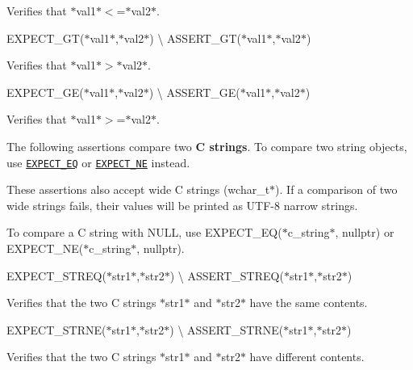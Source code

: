Verifies that $\ast${\ttfamily val1}$\ast${\ttfamily $<$=}$\ast${\ttfamily val2}$\ast$.

{\ttfamily E\+X\+P\+E\+C\+T\+\_\+\+GT(}$\ast${\ttfamily val1}$\ast${\ttfamily ,}$\ast${\ttfamily val2}$\ast${\ttfamily )} \textbackslash{} {\ttfamily A\+S\+S\+E\+R\+T\+\_\+\+GT(}$\ast${\ttfamily val1}$\ast${\ttfamily ,}$\ast${\ttfamily val2}$\ast${\ttfamily )}

Verifies that $\ast${\ttfamily val1}$\ast${\ttfamily $>$}$\ast${\ttfamily val2}$\ast$.

{\ttfamily E\+X\+P\+E\+C\+T\+\_\+\+GE(}$\ast${\ttfamily val1}$\ast${\ttfamily ,}$\ast${\ttfamily val2}$\ast${\ttfamily )} \textbackslash{} {\ttfamily A\+S\+S\+E\+R\+T\+\_\+\+GE(}$\ast${\ttfamily val1}$\ast${\ttfamily ,}$\ast${\ttfamily val2}$\ast${\ttfamily )}

Verifies that $\ast${\ttfamily val1}$\ast${\ttfamily $>$=}$\ast${\ttfamily val2}$\ast$.

The following assertions compare two {\bfseries C strings}. To compare two {\ttfamily string} objects, use \href{#EXPECT_EQ}{\tt {\ttfamily E\+X\+P\+E\+C\+T\+\_\+\+EQ}} or \href{#EXPECT_NE}{\tt {\ttfamily E\+X\+P\+E\+C\+T\+\_\+\+NE}} instead.

These assertions also accept wide C strings ({\ttfamily wchar\+\_\+t$\ast$}). If a comparison of two wide strings fails, their values will be printed as U\+T\+F-\/8 narrow strings.

To compare a C string with {\ttfamily N\+U\+LL}, use {\ttfamily E\+X\+P\+E\+C\+T\+\_\+\+EQ(}$\ast${\ttfamily c\+\_\+string}$\ast${\ttfamily , nullptr)} or {\ttfamily E\+X\+P\+E\+C\+T\+\_\+\+NE(}$\ast${\ttfamily c\+\_\+string}$\ast${\ttfamily , nullptr)}.

{\ttfamily E\+X\+P\+E\+C\+T\+\_\+\+S\+T\+R\+EQ(}$\ast${\ttfamily str1}$\ast${\ttfamily ,}$\ast${\ttfamily str2}$\ast${\ttfamily )} \textbackslash{} {\ttfamily A\+S\+S\+E\+R\+T\+\_\+\+S\+T\+R\+EQ(}$\ast${\ttfamily str1}$\ast${\ttfamily ,}$\ast${\ttfamily str2}$\ast${\ttfamily )}

Verifies that the two C strings $\ast${\ttfamily str1}$\ast$ and $\ast${\ttfamily str2}$\ast$ have the same contents.

{\ttfamily E\+X\+P\+E\+C\+T\+\_\+\+S\+T\+R\+NE(}$\ast${\ttfamily str1}$\ast${\ttfamily ,}$\ast${\ttfamily str2}$\ast${\ttfamily )} \textbackslash{} {\ttfamily A\+S\+S\+E\+R\+T\+\_\+\+S\+T\+R\+NE(}$\ast${\ttfamily str1}$\ast${\ttfamily ,}$\ast${\ttfamily str2}$\ast${\ttfamily )}

Verifies that the two C strings $\ast${\ttfamily str1}$\ast$ and $\ast${\ttfamily str2}$\ast$ have different contents.

